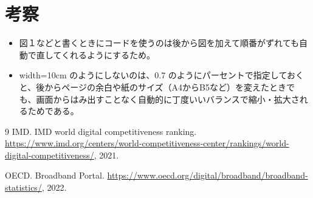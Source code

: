 \documentclass[11pt,a4paper]{jsarticle}
\begin{document}
\section{考察}



\begin{itemize}
    \item 図１などと書くときにコードを使うのは後から図を加えて順番がずれても自動で直してくれるようにするため。
    \item width=10cm のようにしないのは、0.7 のようにパーセントで指定しておくと、後からページの余白や紙のサイズ（A4からB5など）を変えたときでも、画面からはみ出すことなく自動的に丁度いいバランスで縮小・拡大されるためである。
\end{itemize}

\begin{thebibliography}{9}
IMD. IMD world digital competitiveness ranking. \url{https://www.imd.org/centers/world-competitiveness-center/rankings/world-digital-competitiveness/}, 2021.

OECD. Broadband Portal. \url{https://www.oecd.org/digital/broadband/broadband-statistics/}, 2022.
\end{thebibliography}
\end{document}
